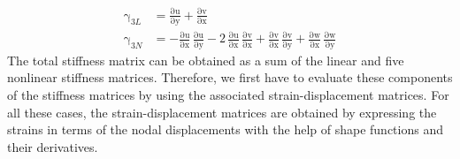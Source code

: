 \begin{subequations}
\begin{align}
	\mathrm \gamma_{3L} & = \mathrm{\frac{\partial u}{\partial y}} + \mathrm{\frac{\partial v}{\partial x}}\\
	\mathrm \gamma_{3N} & = - \mathrm{\frac{\partial u}{\partial x}}\, \mathrm{\frac{\partial u}{\partial y}} - 2 \, \mathrm{\frac{ \partial u}{\partial x}}\, \mathrm{\frac{ \partial v}{\partial x}} + \mathrm{\frac{\partial v}{\partial x}}\, \mathrm{\frac{\partial v}{\partial y}} + \mathrm{\frac{\partial w}{\partial x}}\, \mathrm{\frac{\partial w}{\partial y}} 
	\end{align}
\end{subequations}
The total stiffness matrix can be obtained as a sum of the linear and five nonlinear stiffness matrices. Therefore, we first have to evaluate these components of the stiffness matrices by using the associated strain-displacement matrices. For all these cases, the strain-displacement matrices are obtained by expressing the strains in terms of the nodal displacements with the help of shape functions and their derivatives.

